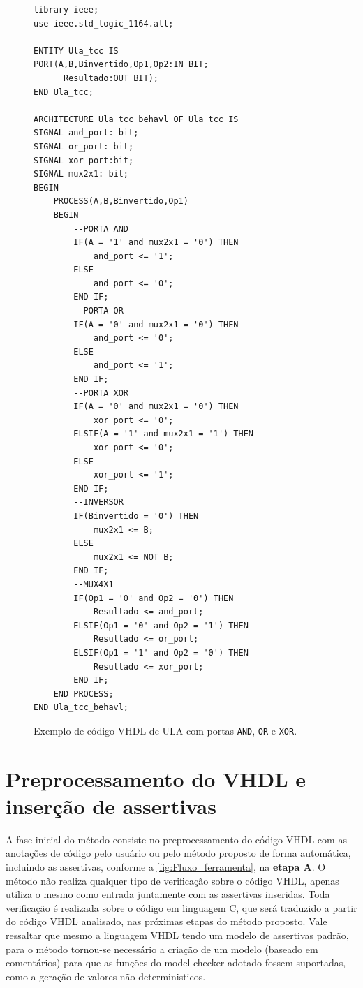\begin{figure}[H]
\caption{\label{fig:code_exemplo} Exemplo de código VHDL de ULA com portas \texttt{AND}, \texttt{OR} e \texttt{XOR}.}
	\begin{center}
    \begin{minipage}{0.6\textwidth}
    \begin{lstlisting}       
library ieee;
use ieee.std_logic_1164.all;

ENTITY Ula_tcc IS
PORT(A,B,Binvertido,Op1,Op2:IN BIT;
	  Resultado:OUT BIT);
END Ula_tcc;

ARCHITECTURE Ula_tcc_behavl OF Ula_tcc IS
SIGNAL and_port: bit;
SIGNAL or_port: bit;
SIGNAL xor_port:bit;
SIGNAL mux2x1: bit;
BEGIN
	PROCESS(A,B,Binvertido,Op1)
	BEGIN
		--PORTA AND
		IF(A = '1' and mux2x1 = '0') THEN
		    and_port <= '1';
		ELSE
		    and_port <= '0';
		END IF;
		--PORTA OR
		IF(A = '0' and mux2x1 = '0') THEN
		    and_port <= '0';
		ELSE
		    and_port <= '1';
		END IF;
		--PORTA XOR
		IF(A = '0' and mux2x1 = '0') THEN
		    xor_port <= '0';
		ELSIF(A = '1' and mux2x1 = '1') THEN
		    xor_port <= '0';
		ELSE
		    xor_port <= '1';
		END IF;
		--INVERSOR
		IF(Binvertido = '0') THEN
			mux2x1 <= B;
		ELSE
			mux2x1 <= NOT B;
		END IF;
		--MUX4X1
		IF(Op1 = '0' and Op2 = '0') THEN
			Resultado <= and_port;
		ELSIF(Op1 = '0' and Op2 = '1') THEN
			Resultado <= or_port;
		ELSIF(Op1 = '1' and Op2 = '0') THEN
			Resultado <= xor_port;
		END IF;
	END PROCESS;
END Ula_tcc_behavl;
    \end{lstlisting}
    \end{minipage}
	\end{center}
\end{figure}

\pagebreak
\section{Preprocessamento do VHDL e inserção de assertivas}
\label{cap:vhdl_assertivas}

\par
A fase inicial do método consiste no preprocessamento do código VHDL com as anotações de código pelo usuário ou pelo método proposto de forma automática, incluindo as assertivas, conforme a \autoref{fig:Fluxo_ferramenta}, na \textbf{etapa A}. O método não realiza qualquer tipo de verificação sobre o código VHDL, apenas utiliza o mesmo como entrada juntamente com as assertivas inseridas. Toda verificação é realizada sobre o código em linguagem C, que será traduzido a partir do código VHDL analisado, nas próximas etapas do método proposto.
Vale ressaltar que mesmo a linguagem VHDL tendo um modelo de assertivas padrão, para o método tornou-se necessário a criação de um modelo (baseado em comentários) para que as funções do model checker adotado fossem suportadas, como a geração de valores não deterministicos.


